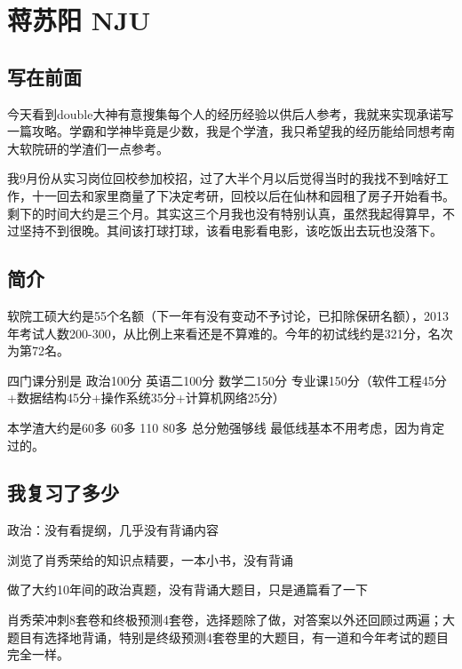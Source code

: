 \section{蒋苏阳 NJU}
\subsection{写在前面}

今天看到double大神有意搜集每个人的经历经验以供后人参考，我就来实现承诺写一篇攻略。学霸和学神毕竟是少数，我是个学渣，我只希望我的经历能给同想考南大软院研的学渣们一点参考。\par

我9月份从实习岗位回校参加校招，过了大半个月以后觉得当时的我找不到啥好工作，十一回去和家里商量了下决定考研，回校以后在仙林和园租了房子开始看书。剩下的时间大约是三个月。其实这三个月我也没有特别认真，虽然我起得算早，不过坚持不到很晚。其间该打球打球，该看电影看电影，该吃饭出去玩也没落下。\par

 

\subsection{简介}

软院工硕大约是55个名额（下一年有没有变动不予讨论，已扣除保研名额），2013年考试人数200-300，从比例上来看还是不算难的。今年的初试线约是321分，名次为第72名。


四门课分别是 政治100分 英语二100分 数学二150分 专业课150分（软件工程45分+数据结构45分+操作系统35分+计算机网络25分）\par

本学渣大约是60多 60多 110  80多 总分勉强够线  最低线基本不用考虑，因为肯定过的。

 

 

\subsection{我复习了多少}

政治：没有看提纲，几乎没有背诵内容\par

浏览了肖秀荣给的知识点精要，一本小书，没有背诵\par

做了大约10年间的政治真题，没有背诵大题目，只是通篇看了一下\par

肖秀荣冲刺8套卷和终极预测4套卷，选择题除了做，对答案以外还回顾过两遍；大题目有选择地背诵，特别是终级预测4套卷里的大题目，有一道和今年考试的题目完全一样。\par

